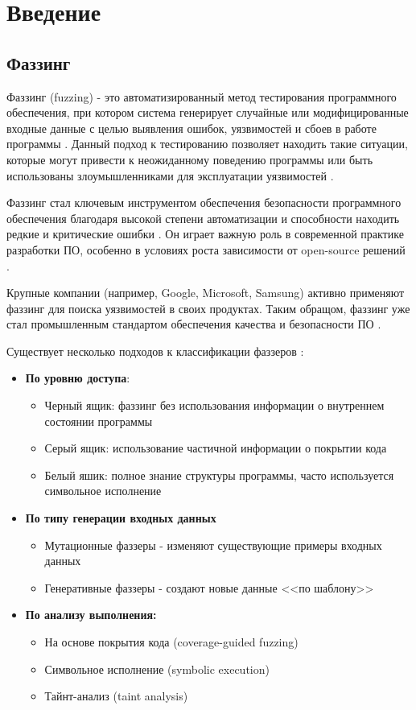 \section{Введение}
\subsection{Фаззинг}
Фаззинг (fuzzing) - это автоматизированный метод тестирования программного обеспечения, при котором система генерирует случайные или модифицированные входные данные с целью выявления ошибок, уязвимостей и сбоев в работе программы \cite{Kuliamin}. Данный подход к тестированию позволяет находить такие ситуации, которые могут привести к неожиданному поведению программы или быть использованы злоумышленниками для эксплуатации уязвимостей \cite{Manes}.

Фаззинг стал ключевым инструментом обеспечения безопасности программного обеспечения благодаря высокой степени автоматизации и способности находить редкие и критические ошибки \cite{Manes}. Он играет важную роль в современной практике разработки ПО, особенно в условиях роста зависимости от open-source решений \cite{Boehme}.

Крупные компании (например, Google, Microsoft, Samsung) активно применяют фаззинг для поиска уязвимостей в своих продуктах. Таким обращом, фаззинг уже стал промышленным стандартом обеспечения качества и безопасности ПО \cite{Boehme}.

Существует несколько подходов к классификации фаззеров \cite{Kuliamin}\cite{Boehme}:
\begin{itemize}
	\item \textbf{По уровню доступа}:
	\begin{itemize}
		\item Черный ящик: фаззинг без использования информации о внутреннем состоянии программы
		\item Серый ящик: использование частичной информации о покрытии кода
		\item Белый яшик: полное знание структуры программы, часто используется символьное исполнение
	\end{itemize}
	\item \textbf{По типу генерации входных данных}
	\begin{itemize}
		\item Мутационные фаззеры - изменяют существующие примеры входных данных
		\item Генеративные фаззеры - создают новые данные <<по шаблону>>
	\end{itemize}
	\item \textbf{По анализу выполнения:}
	\begin{itemize}
		\item На основе покрытия кода (coverage-guided fuzzing)
		\item Символьное исполнение (symbolic execution)
		\item Тайнт-анализ (taint analysis)
	\end{itemize}
\end{itemize}


